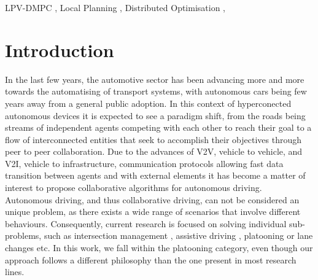 \documentclass[a4paper,fleqn]{cas-sc}
\begin{document}
\begin{keywords}
LPV-DMPC \sep
Local Planning \sep 
Distributed Optimisation \sep 
\end{keywords}


\maketitle

\section{Introduction}
\label{seq:Intro}
In the last few years, the automotive sector has been advancing more and more towards the automatising of transport systems, with autonomous cars being few years away from a general public adoption. In this context of hyperconected autonomous devices it is expected to see a paradigm shift, from the roads being streams of independent agents competing with each other to reach their goal to a flow of interconnected entities that seek to accomplish their objectives through peer to peer collaboration. Due to the advances of V2V, vehicle to vehicle, and V2I, vehicle to infrastructure, communication protocols allowing fast data transition between agents and with external elements it has become a matter of interest to propose collaborative algorithms for autonomous driving.\\ 

Autonomous driving, and thus collaborative driving, can not be considered an unique problem, as there exists a wide range of scenarios that involve different behaviours. Consequently, current research is focused on solving individual sub-problems, such as intersection management \cite{Pei2021}, assistive driving \cite{medero2021control}, platooning \cite{Vlachos2022} or lane changes \cite{LaneChangeXie2021} etc. In this work, we fall within the platooning category, even though our approach follows a different philosophy than the one present in most research lines.\\ 
\end{document}
